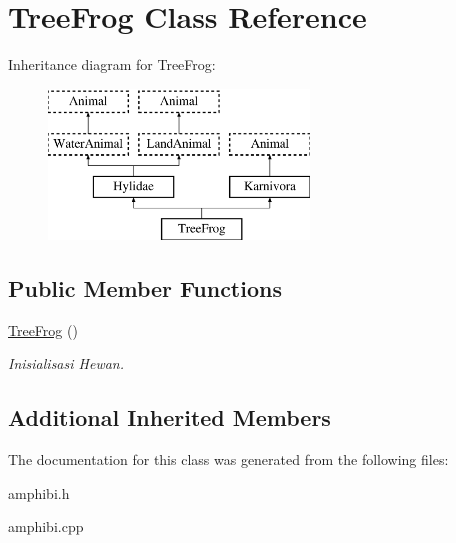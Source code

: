 \hypertarget{class_tree_frog}{}\section{Tree\+Frog Class Reference}
\label{class_tree_frog}
Inheritance diagram for Tree\+Frog\+:\begin{figure}[H]
\begin{center}
\leavevmode
\includegraphics[height=4.000000cm]{class_tree_frog}
\end{center}
\end{figure}
\subsection*{Public Member Functions}
\begin{DoxyCompactItemize}
\item 
\hyperlink{class_tree_frog_a5eb39d8c85a8a682451f7c2a3882076c}{Tree\+Frog} ()\hypertarget{class_tree_frog_a5eb39d8c85a8a682451f7c2a3882076c}{}\label{class_tree_frog_a5eb39d8c85a8a682451f7c2a3882076c}

\begin{DoxyCompactList}\small\item\em Inisialisasi Hewan. \end{DoxyCompactList}\end{DoxyCompactItemize}
\subsection*{Additional Inherited Members}


The documentation for this class was generated from the following files\+:\begin{DoxyCompactItemize}
\item 
amphibi.\+h\item 
amphibi.\+cpp\end{DoxyCompactItemize}
